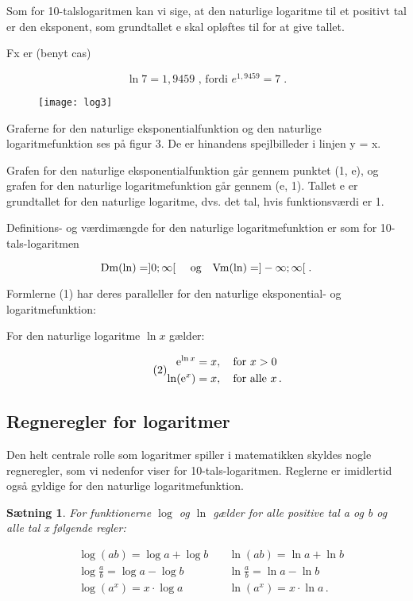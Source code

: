 \documentclass[12pt,oneside,a4paper]{article}
\theoremstyle{plain}
\newtheorem*{thm}{Sætning}
\begin{document}
Som for 10-talslogaritmen kan vi sige, at den naturlige logaritme til et
positivt tal er den eksponent, som grundtallet e skal opløftes til for at give
tallet.

Fx er (benyt cas)

\[
\ln 7 = 1,9459 \text{ , fordi } e^{1,9459} = 7 \; .
\]

\begin{figure}[ht]
    \centering
    \texttt{[image: log3]}
    \caption{}
    \label{fig3}
\end{figure}

Graferne for den naturlige eksponentialfunktion og den naturlige
logaritmefunktion ses på figur 3. De er hinandens spejlbilleder i linjen y =
x.

Grafen for den naturlige eksponentialfunktion går gennem punktet (1, e), og
grafen for den naturlige logaritmefunktion går gennem (e, 1). Tallet e er
grundtallet for den naturlige logaritme, dvs. det tal, hvis funktionsværdi er
1.

Definitions- og værdimængde for den naturlige logaritmefunktion er som for
10-tals-logaritmen

\[
\mathrm{Dm}(\ln) = ]0; \infty[ \text{ \quad og\quad } \mathrm{Vm}(\ln) = ]-\infty; \infty[ \; .
\]

Formlerne (1) har deres paralleller for den naturlige eksponential- og
logaritmefunktion:

For den naturlige logaritme $\ln x$ gælder:

\[
    \tag{2}
    \begin{aligned}
        {\rm e}^{\ln x } &= x,\quad \text{for $x > 0$} \\
        \ln ({\rm e}^x) &= x,\quad \text{for alle $x$\,.}
    \end{aligned}
\]

\subsection*{Regneregler for logaritmer}

Den helt centrale rolle som logaritmer spiller i matematikken skyldes nogle
regneregler, som vi nedenfor viser for 10-tals-logaritmen. Reglerne er
imidlertid også gyldige for den naturlige logaritmefunktion.

\begin{thm}

For funktionerne $\log$ og $\ln$ gælder for alle positive tal a og b og alle tal x
følgende regler:

\[
    \begin{aligned}
        &\log (ab) = \log a + \log b \quad  &\ln(ab) = \ln a + \ln b  \\
        &\log \frac{a}{b} = \log a - \log b &\ln \frac{a}{b} = \ln a - \ln b \\
        &\log(a^x) = x \cdot \log a         &\ln(a^x) = x \cdot \ln a \, .
    \end{aligned}
\]
\end{thm}
\end{document}
